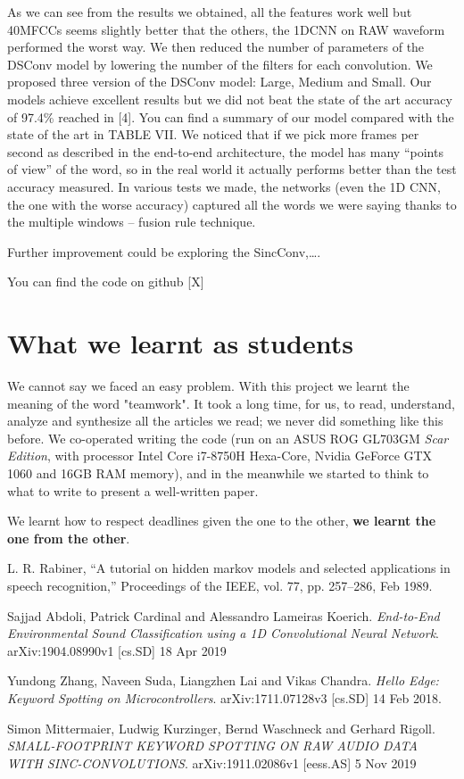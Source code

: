 \documentclass[conference]{IEEEtran}
\begin{document}
As we can see from the results we obtained, all the features work well but 40MFCCs seems slightly better that the others, the 1DCNN on RAW waveform performed the worst way.
We then reduced the number of parameters of the DSConv model by lowering the number of the filters for each convolution. We proposed three version of the DSConv model: Large, Medium and Small.
Our models achieve excellent results but we did not beat the state of the art accuracy of 97.4\% reached in [4]. You can find a summary of our model compared with the state of the art in TABLE VII.
We noticed that if we pick more frames per second as described in the end-to-end architecture, the model has many “points of view” of the word, so in the real world it actually performs better than the test accuracy measured. In various tests we made, the networks (even the 1D CNN, the one with the worse accuracy) captured all the words we were saying thanks to the multiple windows – fusion rule technique.

Further improvement could be exploring the SincConv,….

You can find the code on github [X]

\section*{What we learnt as students}
We cannot say we faced an easy problem. With this project we learnt the meaning of the word "teamwork". It took a long time, for us, to read, understand, analyze and synthesize all the articles we read; we never did something like this before. We co-operated writing the code (run on an ASUS ROG GL703GM \textit{Scar Edition}, with processor Intel Core i7-8750H Hexa-Core, Nvidia  GeForce GTX 1060 and 16GB RAM memory), and in the meanwhile we started to think to what to write to present a well-written paper.

We learnt how to respect deadlines given the one to the other, \textbf{we learnt the one from the other}.

\begin{thebibliography}{1}
L. R. Rabiner, “A tutorial on hidden markov models and selected applications in speech recognition,” Proceedings of the IEEE, vol. 77, pp. 257–286, Feb 1989.

Sajjad Abdoli, Patrick Cardinal and Alessandro Lameiras Koerich. \textit{End-to-End Environmental Sound Classification using a 1D Convolutional Neural Network}. arXiv:1904.08990v1 [cs.SD] 18 Apr 2019

Yundong Zhang, Naveen Suda, Liangzhen Lai and Vikas Chandra. \textit{Hello Edge: Keyword Spotting on Microcontrollers}. arXiv:1711.07128v3 [cs.SD] 14 Feb 2018.

Simon Mittermaier, Ludwig Kurzinger, Bernd Waschneck and Gerhard Rigoll. \textit{SMALL-FOOTPRINT KEYWORD SPOTTING ON RAW AUDIO DATA WITH SINC-CONVOLUTIONS}. arXiv:1911.02086v1 [eess.AS] 5 Nov 2019

\end{thebibliography}
\end{document}
